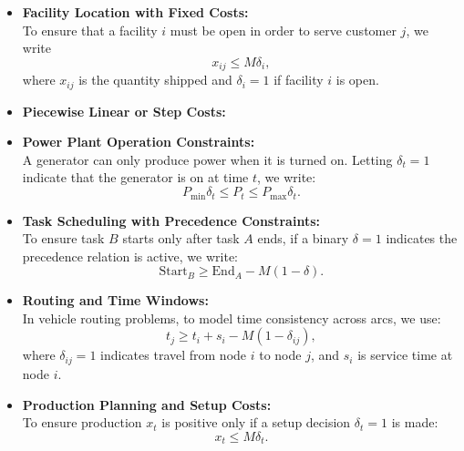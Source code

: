 \begin{itemize}
  \item \textbf{Facility Location with Fixed Costs:}\\
  To ensure that a facility \(i\) must be open in order to serve customer \(j\), we write
  \[
  x_{ij} \le M \delta_i,
  \]
  where \(x_{ij}\) is the quantity shipped and \(\delta_i = 1\) if facility \(i\) is open.

\item \textbf{Piecewise Linear or Step Costs:}\\
\[
\]

  \item \textbf{Power Plant Operation Constraints:}\\
  A generator can only produce power when it is turned on. Letting \(\delta_t = 1\) indicate that the generator is on at time \(t\), we write:
  \[
  P_{\min} \delta_t \le P_t \le P_{\max} \delta_t.
  \]

  \item \textbf{Task Scheduling with Precedence Constraints:}\\
  To ensure task \(B\) starts only after task \(A\) ends, if a binary \(\delta = 1\) indicates the precedence relation is active, we write:
  \[
  \text{Start}_B \ge \text{End}_A - M(1 - \delta).
  \]

  \item \textbf{Routing and Time Windows:}\\
  In vehicle routing problems, to model time consistency across arcs, we use:
  \[
  t_j \ge t_i + s_i - M(1 - \delta_{ij}),
  \]
  where \(\delta_{ij} = 1\) indicates travel from node \(i\) to node \(j\), and \(s_i\) is service time at node \(i\).

  \item \textbf{Production Planning and Setup Costs:}\\
  To ensure production \(x_t\) is positive only if a setup decision \(\delta_t = 1\) is made:
  \[
  x_t \le M \delta_t.
  \]
\end{itemize}
\newpage
